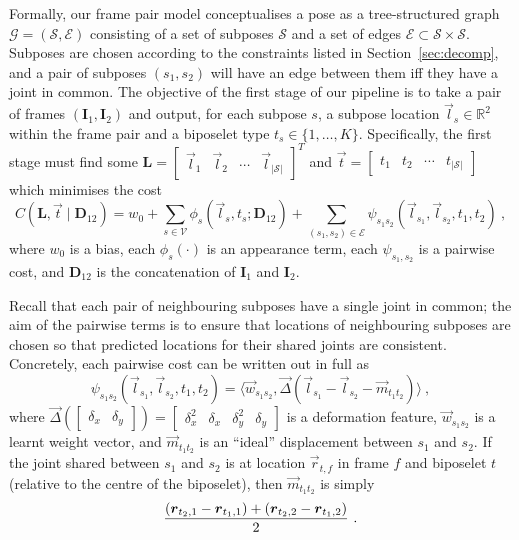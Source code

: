 \documentclass[runningheads]{llncs}
\newcommand{\mat}{\mathbf}
\begin{document}
Formally, our frame pair model conceptualises a pose as a tree-structured graph
$\mathcal G = (\mathcal S, \mathcal E)$ consisting of a set of subposes
$\mathcal S$ and a set of edges $\mathcal E \subset \mathcal S \times \mathcal
S$. Subposes are chosen according to the constraints listed in
Section~\ref{sec:decomp}, and a pair of subposes $(s_1, s_2)$ will have an edge
between them iff they have a joint in common. The objective of the first stage
of our pipeline is to take a pair of frames $(\mat I_1, \mat I_2)$ and output,
for each subpose $s$, a subpose location $\vec l_s \in \mathbb R^2$ within the
frame pair and a biposelet type $t_s \in \{1, \ldots, K\}$. Specifically, the
first stage must find some $\mat L = \begin{bmatrix}\vec l_1 & \vec l_2 & \cdots
& \vec l_{|\mathcal S|}\end{bmatrix}^T$ and $\vec t = \begin{bmatrix}t_1 & t_2 &
\cdots & t_{|\mathcal S|}\end{bmatrix}$ which minimises the cost
%
\begin{equation}\label{eqn:full-cost}
C(\mat L, \vec t \mid \mat D_{12})
= w_0 + \sum_{s \in \mathcal V} \phi_s(\vec l_s, t_s; \mat D_{12})
+ \sum_{(s_1, s_2) \in \mathcal E}
    \psi_{s_1 s_2}(\vec l_{s_1}, \vec l_{s_2}, t_1, t_2)~,
\end{equation}
%
where $w_0$ is a bias, each $\phi_s(\cdot)$ is an appearance term, each
$\psi_{s_1,s_2}$ is a pairwise cost, and $\mat D_{12}$ is the concatenation
of $\mat I_1$ and $\mat I_2$.

Recall that each pair of neighbouring subposes have a single joint in common;
the aim of the pairwise terms is to ensure that locations of neighbouring
subposes are chosen so that predicted locations for their shared joints are
consistent. Concretely, each pairwise cost can be written out in full as
%
\begin{equation}\label{eqn:pair-cost}
\psi_{s_1 s_2}(\vec l_{s_1}, \vec l_{s_2}, t_1, t_2)
= \langle
    \vec w_{s_1 s_2},
    \vec \Delta(\vec l_{s_1} - \vec l_{s_2}  - \vec m_{t_1 t_2})
\rangle~,
\end{equation}
%
where $\vec \Delta(\begin{bmatrix}\delta_x & \delta_y\end{bmatrix}) =
\begin{bmatrix}\delta_x^2 & \delta_x & \delta_y^2 & \delta_y\end{bmatrix}$ is a
deformation feature, $\vec w_{s_1 s_2}$ is a learnt weight vector, and
$\vec m_{t_1 t_2}$ is an ``ideal'' displacement between $s_1$ and $s_2$. If the
joint shared between $s_1$ and $s_2$ is at location $\vec r_{t,f}$ in frame $f$
and biposelet $t$ (relative to the centre of the biposelet), then $\vec m_{t_1
t_2}$ is simply
\begin{equation}
\frac{%
    \left(\vec r_{t_2,1} - \vec r_{t_1,1}\right)
    + \left(\vec r_{t_2,2} - \vec r_{t_1,2}\right)
}{2}~.
\end{equation}
\end{document}
